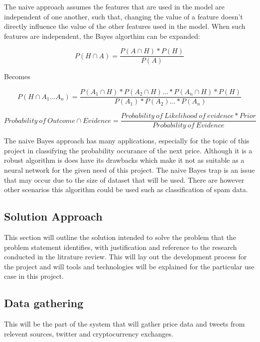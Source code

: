 \documentclass[oneside, 10pt]{article}
\begin{document}
			The naive approach assumes the features that are used in the model are independent of one another, such that, changing the value of a feature doesn't directly influence the value of the other features used in the model. When such features are independent, the Bayes algorthim can be expanded:
			
			\[P(H\cap A) = \frac{P(A\cap H) * P(H)}{P(A)} \]
			
			\begin{center}
				Becomes
			\end{center}
			
			\[P(H\cap A_1 ... A_n) = \frac{P(A_1\cap H) * P(A_2\cap H) ... * P(A_n\cap H) * P(H)}{P(A_1) * P(A_2) ... * P(A_n)} \]
			
			\[Probability \ of \ Outcome \cap Evidence = \frac{Probability \ of \ Likelihood \ of \ evidence * Prior}{Probability \ of \ Evidence} \]
			
			The naive Bayes approach has many applications, especially for the topic of this project in classifying the probability occurance of the next price. Although it is a robust algorithm is does have its drawbacks which make it not as suitable as a neural network for the given need of this project. The naive Bayes trap is an issue that may occur due to the size of dataset that will be used. There are however other scenarios this algorithm could be used such as classification of spam data.\cite{32}
		
	\newpage
	
	\begin{center}
		\section{Solution Approach}\label{solution}
	\end{center}
		This section will outline the solution intended to solve the problem that the problem statement identifies, with justification and reference to the research conducted in the litrature review. This will lay out the development process for the project and will tools and technologies will be explained for the particular use case in this project.
		\newline
		
		\subsection{Data gathering}
		This will be the part of the system that will gather price data and tweets from relevent sources, twitter and cryptocurrency exchanges.
		\newline
		
\end{document}
